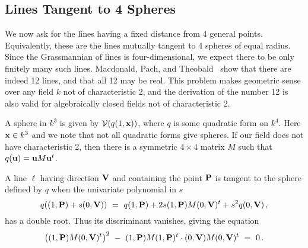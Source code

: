 \subsection{Lines Tangent to 4 Spheres}\label{sec:12lines}
We now ask for the lines having a fixed distance from 4 general points.
Equivalently, these are the lines mutually tangent to 4 spheres of equal radius.
Since the Grassmannian of lines is four-dimensional, we
expect there to be only finitely many such lines.
Macdonald, Pach, and Theobald~\cite{SO:MPT00} show that there
are indeed 12 lines, and that all 12 may be real.
This problem makes geometric sense over any field $k$ not of characteristic
2, and the derivation of the number 12 is also valid for algebraically
closed 
fields not of characteristic 2.

A sphere in $k^3$ is given by ${\mathcal V}(q(1,{\bf x}))$, where 
$q$ is some quadratic form on $k^4$. 
Here ${\bf x}\in k^3$ and we note that not all quadratic forms give spheres.
If our field does not have characteristic 2, then there 
is a symmetric $4\times 4$ matrix $M$ such that 
$q({\bf u})={\bf u}M{\bf u}^t$.

A line $\ell$ having direction ${\bf V}$ and containing the point ${\bf P}$ 
is tangent to the sphere defined by $q$ when the univariate polynomial in $s$ 
$$
  q( (1,{\bf P})+s(0,{\bf V}) )\ =\ 
  q(1,{\bf P}) + 2s (1,{\bf P})M (0,{\bf V})^t + s^2q(0,{\bf V})\,,
$$
has a double root.
Thus its discriminant vanishes, giving the equation
%
\begin{equation}\label{eq:sphere}
  \left( (1,{\bf P})M(0,{\bf V})^t\right)^2 \ -\ 
   (1,{\bf P})M (1,{\bf P})^t\cdot(0,{\bf V})M (0,{\bf V})^t 
     \ =\ 0\,.
\end{equation}
%

